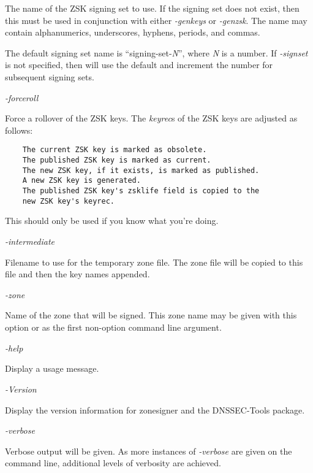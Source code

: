\begin{description}
The name of the ZSK signing set to use.  If the signing set does not exist,
then this must be used in conjunction with either {\it -genkeys} or {\it
-genzsk}.  The name may contain alphanumerics, underscores, hyphens, periods,
and commas.

The default signing set name is ``signing-set-{\it N}'', where {\it N} is a
number.  If {\it -signset} is not specified, then  will use
the default and increment the number for subsequent signing sets.

\item {\it -forceroll}\verb" "

Force a rollover of the ZSK keys.  The {\it keyrec}s of the ZSK keys are
adjusted as follows:

\begin{verbatim}
    The current ZSK key is marked as obsolete.
    The published ZSK key is marked as current.
    The new ZSK key, if it exists, is marked as published.
    A new ZSK key is generated.
    The published ZSK key's zsklife field is copied to the
    new ZSK key's keyrec.
\end{verbatim}

This should only be used if you know what you're doing.

\item {\it -intermediate}\verb" "

Filename to use for the temporary zone file.  The zone file will be copied to
this file and then the key names appended.

\item {\it -zone}\verb" "

Name of the zone that will be signed.  This zone name may be given with this
option or as the first non-option command line argument.

\item {\it -help}\verb" "

Display a usage message.

\item {\it -Version}\verb" "

Display the version information for zonesigner and the DNSSEC-Tools package.

\item {\it -verbose}\verb" "

Verbose output will be given.  As more instances of {\it -verbose} are given on
the command line, additional levels of verbosity are achieved.


\end{description}
